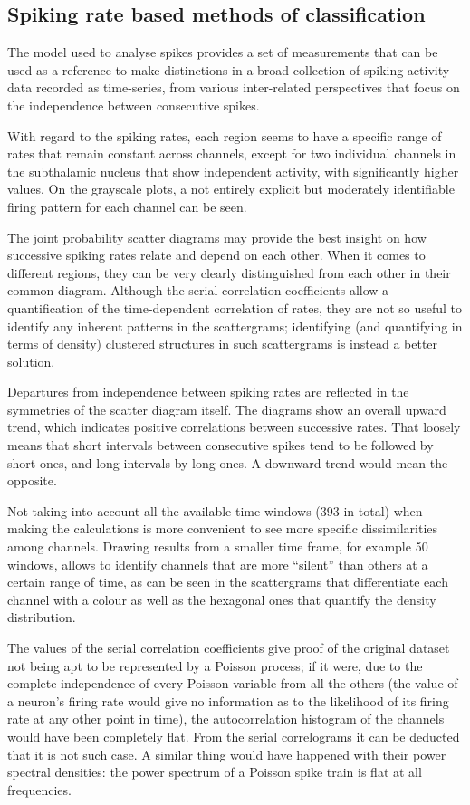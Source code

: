 \documentclass{article}
\begin{document}
\subsection{Spiking rate based methods of classification}

The model used to analyse spikes provides a set of measurements that can be used as a reference to make distinctions in a broad collection of spiking activity data recorded as time-series, from various inter-related perspectives that focus on the independence between consecutive spikes.

With regard to the spiking rates, each region seems to have a specific range of rates that remain constant across channels, except for two individual channels in the subthalamic nucleus that show independent activity, with significantly higher values. 
On the grayscale plots, a not entirely explicit but moderately identifiable firing pattern for each channel can be seen. 

The joint probability scatter diagrams may provide the best insight on how successive spiking rates relate and depend on each other. 
When it comes to different regions, they can be very clearly distinguished from each other in their common diagram. 
Although the serial correlation coefficients allow a quantification of the time-dependent correlation of rates, they are not so useful to identify any inherent patterns in the scattergrams; identifying (and quantifying in terms of density) clustered structures in such scattergrams is instead a better solution. 

Departures from independence between spiking rates are reflected in the symmetries of the scatter diagram itself. 
The diagrams show an overall upward trend, which indicates positive correlations between successive rates. 
That loosely means that short intervals between consecutive spikes tend to be followed by short ones, and long intervals by long ones. 
A downward trend would mean the opposite.

Not taking into account all the available time windows (393 in total) when making the calculations is more convenient to see more specific dissimilarities among channels. 
Drawing results from a smaller time frame, for example 50 windows, allows to identify channels that are more “silent” than others at a certain range of time, as can be seen in the scattergrams that differentiate each channel with a colour as well as the hexagonal ones that quantify the density distribution. 

The values of the serial correlation coefficients give proof of the original dataset not being apt to be represented by a Poisson process; if it were, due to the complete independence of every Poisson variable from all the others (the value of a neuron's firing rate would give no information as to the likelihood of its firing rate at any other point in time), the autocorrelation histogram of the channels would have been completely flat. 
From the serial correlograms it can be deducted that it is not such case. 
A similar thing would have happened with their power spectral densities: the power spectrum of a Poisson spike train is flat at all frequencies.
\end{document}
